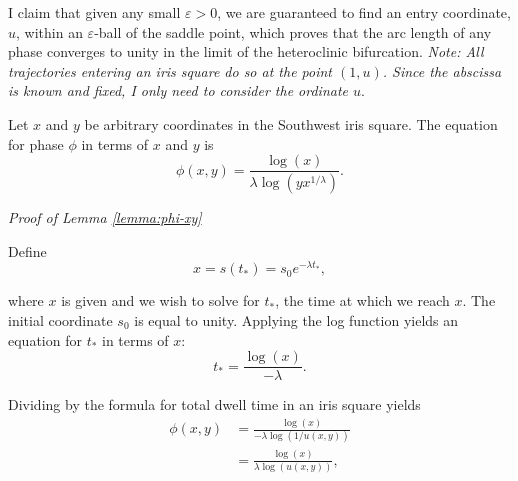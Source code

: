 I claim that given any small $\varepsilon>0$, we are guaranteed to find an entry coordinate, $u$, within an $\varepsilon$-ball of the saddle point, which proves that the arc length of any phase converges to unity in the limit of the heteroclinic bifurcation. \textit{Note: All trajectories entering an iris square do so at the point $(1,u)$.  Since the abscissa is known and fixed, I only need to consider the ordinate $u$}.



\begin{lemma}Let $x$ and $y$ be arbitrary coordinates in the Southwest iris square. The equation for phase $\phi$ in terms of $x$ and $y$ is
\begin{equation}\label{phixy}
\phi(x,y) = \frac{\log(x)}{\lambda \log(y x^{1/\lambda})}.
\end{equation}
\label{lemma:phi-xy}\end{lemma}
\textit{Proof of Lemma \ref{lemma:phi-xy}}

Define
\begin{equation}
x = s(t_*) = s_0 e^{-\lambda t_*},
\end{equation}

where $x$ is given and we wish to solve for $t_*$, the time at which we reach $x$.  The initial coordinate $s_0$ is equal to unity.  Applying the log function yields an equation for $t_*$ in terms of $x$:
\begin{equation}\label{tstar}
t_* = \frac{\log(x)}{-\lambda}.
\end{equation}

Dividing by the formula for total dwell time in an iris square yields
\begin{equation}\label{phixytemp}
\begin{split}
\phi(x,y) &=\frac{\log(x)}{-\lambda \log(1/u(x,y))}\\
&=\frac{\log(x)}{\lambda \log(u(x,y))},\\
\end{split}
\end{equation}

